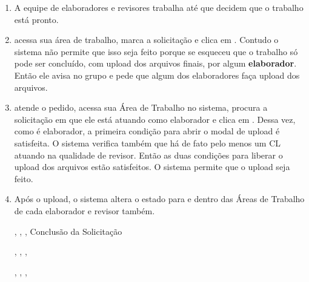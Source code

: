\begin{landscape}
\begin{enumerate}
	{}{\ET, \EQ, \EC}{\RT, \RQ}{\EQ}

	{}{\ET, \EQ, \EC}{\RT, \RQ}{\EC}
	
	{}{\ET, \EQ, \EC}{\RT, \RQ}{\RT}

	{}{\ET, \EQ, \EC}{\RT, \RQ}{\RQ}	
	
	\item A equipe de elaboradores e revisores trabalha até que decidem que o trabalho está pronto.
	
	\item \RT acessa sua área de trabalho, marca a solicitação e clica em \bConcluir. Contudo o sistema não permite que isso seja feito porque \RT se esqueceu que o trabalho só pode ser concluído, com upload dos arquivos finais, por algum \textbf{elaborador}. Então ele avisa no grupo e pede que algum dos elaboradores faça upload dos arquivos. 
	
	\item \EC atende o pedido, acessa sua Área de Trabalho no sistema, procura a solicitação \SOLD em que ele está atuando como elaborador e clica em \bConcluir. Dessa vez, como \EC é elaborador, a primeira condição para abrir o modal de upload é satisfeita. O sistema verifica também que há de fato pelo menos um CL atuando na qualidade de revisor. Então as duas condições para liberar o upload dos arquivos estão satisfeitos. O sistema permite que o upload seja feito.
	
	\item Após o upload, o sistema altera o estado para  e dentro das Áreas de Trabalho de cada elaborador e revisor também.
	
	{}{\ET, \EQ, \EC}{\RT, \RQ}{Conclusão da Solicitação}

	{}{\ET, \EQ, \EC}{\RT, \RQ}{\ET}
	
	{}{\ET, \EQ, \EC}{\RT, \RQ}{\EQ}
	

\end{enumerate}
\end{landscape}
